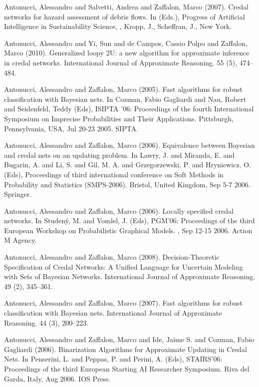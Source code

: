 \begin{cventries}
\begin{cvitems}
\item Antonucci, Alessandro and Salvetti, Andrea and Zaffalon, Marco (2007).   Credal networks for hazard assessment of debris flows.   In (Eds.), Progress of Artificial Intelligence in Sustainability Science, , Kropp, J., Scheffran, J., New York.
\item Antonucci, Alessandro and Yi, Sun and de Campos, Cassio Polpo and Zaffalon, Marco (2010).   Generalized loopy 2U: a new algorithm for approximate inference in credal networks.   International Journal of Approximate Reasoning. 55 (5), 474–484.
\item Antonucci, Alessandro and Zaffalon, Marco (2005).   Fast algorithms for robust classification with Bayesian nets.   In Cozman, Fabio Gagliardi and Nau, Robert and Seidenfeld, Teddy (Eds), ISIPTA ’06: Proceedings of the fourth International Symposium on Imprecise Probabilities and Their Applications.   Pittsburgh, Pennsylvania, USA,   Jul 20-23 2005.   SIPTA.
\item Antonucci, Alessandro and Zaffalon, Marco (2006).   Equivalence between Bayesian and credal nets on an updating problem.   In Lawry, J. and Miranda, E. and Bugarin, A. and Li, S. and Gil, M. A. and Grzegorzewski, P. and Hryniewicz, O. (Eds), Proceedings of third international conference on Soft Methods in Probability and Statistics (SMPS-2006).   Bristol, United Kingdom,   Sep 5-7 2006.   Springer.
\item Antonucci, Alessandro and Zaffalon, Marco (2006).   Locally specified credal networks.   In Studený, M. and Vomlel, J. (Eds), PGM’06: Proceedings of the third European Workshop on Probabilistic Graphical Models.   ,   Sep 12-15 2006.   Action M Agency.
\item Antonucci, Alessandro and Zaffalon, Marco (2008).   Decision-Theoretic Specification of Credal Networks: A Unified Language for Uncertain Modeling with Sets of Bayesian Networks.   International Journal of Approximate Reasoning. 49 (2), 345–361.
\item Antonucci, Alessandro and Zaffalon, Marco (2007).   Fast algorithms for robust classification with Bayesian nets.   International Journal of Approximate Reasoning. 44 (3), 200–223.
\item Antonucci, Alessandro and Zaffalon, Marco and Ide, Jaime S. and Cozman, Fabio Gagliardi (2006).   Binarization Algorithms for Approximate Updating in Credal Nets.   In Penserini, L. and Peppas, P. and Perini, A. (Eds), STAIRS’06: Proceedings of the third European Starting AI Researcher Symposium.   Riva del Garda, Italy,   Aug 2006.   IOS Press.

\end{cvitems}
\end{cventries}
